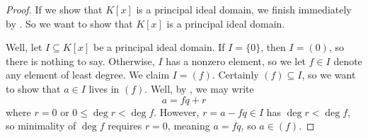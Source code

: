 \documentclass[../notes.tex]{subfiles}
\begin{document}
\begin{proof}
	If we show that $K[x]$ is a principal ideal domain, we finish immediately by . So we want to show that $K[x]$ is a principal ideal domain.

	Well, let $I\subseteq K[x]$ be a principal ideal domain. If $I=\{0\}$, then $I=(0)$, so there is nothing to say. Otherwise, $I$ has a nonzero element, so we let $f\in I$ denote any element of least degree. We claim $I=(f)$. Certainly $(f)\subseteq I$, so we want to show that $a\in I$ lives in $(f)$. Well, by , we may write
	\[a=fq+r\]
	where $r=0$ or $0\le\deg r<\deg f$. However, $r=a-fq\in I$ has $\deg r<\deg f$, so minimality of $\deg f$ requires $r=0$, meaning $a=fq$, so $a\in(f)$.
\end{proof}
\end{document}
